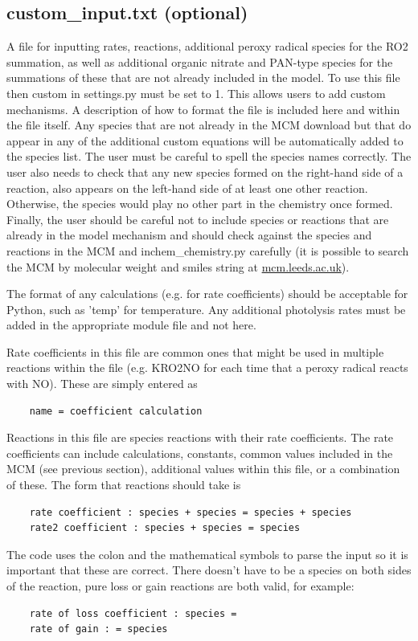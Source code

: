 \documentclass[a4paper]{refart}
\begin{document}
\subsection{custom\_input.txt (optional)}\label{custom_input.txt}
A file for inputting rates, reactions, additional peroxy radical species for the RO2 summation, as well as additional organic nitrate and PAN-type species for the summations of these that are not already included in the model. To use this file then custom in settings.py must be set to 1. This allows users to add custom mechanisms. A description of how to format the file is included here and within the file itself. Any species that are not already in the MCM download but that do appear in any of the additional custom equations will be automatically added to the species list. The user must be careful to spell the species names correctly. The user also needs to check that any new species formed on the right-hand side of a reaction, also appears on the left-hand side of at least one other reaction. Otherwise, the species would play no other part in the chemistry once formed. Finally, the user should be careful not to include species or reactions that are already in the model mechanism and should check against the species and reactions in the MCM and inchem\_chemistry.py carefully (it is possible to search the MCM by molecular weight and smiles string at \url{mcm.leeds.ac.uk}).

The format of any calculations (e.g. for rate coefficients) should be acceptable for Python, such as 'temp' for temperature. Any additional photolysis rates must be added in the appropriate module file and not here.

Rate coefficients in this file are common ones that might be used in multiple reactions within the file (e.g. KRO2NO for each time that a peroxy radical reacts with NO). These are simply entered as
\begin{verbatim}
    name = coefficient calculation
\end{verbatim}

Reactions in this file are species reactions with their rate coefficients. The rate coefficients can include calculations, constants, common values included in the MCM (see previous section), additional values within this file, or a combination of these. The form that reactions should take is
\begin{verbatim}
    rate coefficient : species + species = species + species
    rate2 coefficient : species + species = species
\end{verbatim}
The code uses the colon and the mathematical symbols to parse the input so it is important that these are correct. There doesn't have to be a species on both sides of the reaction, pure loss or gain reactions are both valid, for example:
\begin{verbatim}
    rate of loss coefficient : species = 
    rate of gain : = species
\end{verbatim}
\end{document}
